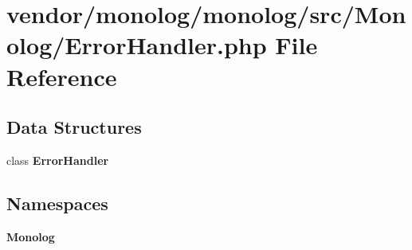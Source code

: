 \section{vendor/monolog/monolog/src/\+Monolog/\+Error\+Handler.php File Reference}
\label{monolog_2monolog_2src_2_monolog_2_error_handler_8php}
\subsection*{Data Structures}
\begin{DoxyCompactItemize}
\item 
class {\bf Error\+Handler}
\end{DoxyCompactItemize}
\subsection*{Namespaces}
\begin{DoxyCompactItemize}
\item 
 {\bf Monolog}
\end{DoxyCompactItemize}
